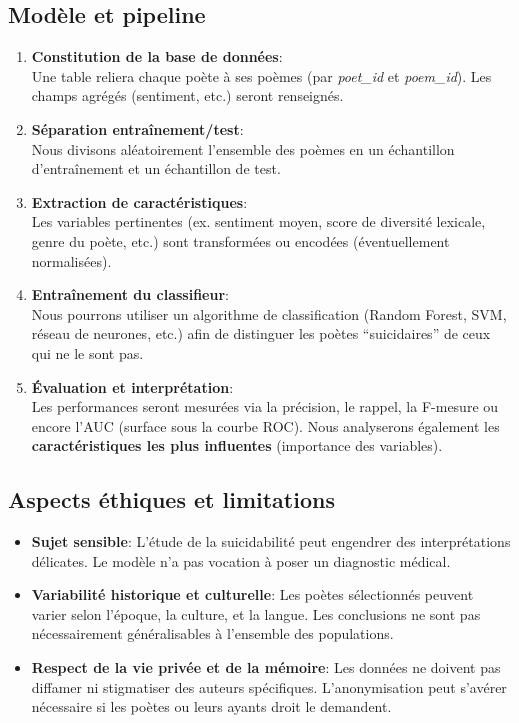 \documentclass[12pt,a4paper]{article}
\begin{document}
\subsection{Modèle et pipeline}

\begin{enumerate}
    \item \textbf{Constitution de la base de données}:\\
    Une table reliera chaque poète à ses poèmes (par \textit{poet\_id} 
    et \textit{poem\_id}). 
    Les champs agrégés (sentiment, etc.) seront renseignés.

    \item \textbf{Séparation entraînement/test}:\\
    Nous divisons aléatoirement l'ensemble des poèmes 
    en un échantillon d'entraînement et un échantillon de test.

    \item \textbf{Extraction de caractéristiques}:\\
    Les variables pertinentes (ex. sentiment moyen, score de diversité lexicale, 
    genre du poète, etc.) sont transformées ou encodées (éventuellement normalisées).

    \item \textbf{Entraînement du classifieur}:\\
    Nous pourrons utiliser un algorithme de classification (Random Forest, 
    SVM, réseau de neurones, etc.) afin de distinguer les poètes ``suicidaires'' 
    de ceux qui ne le sont pas.

    \item \textbf{Évaluation et interprétation}:\\
    Les performances seront mesurées via la précision, le rappel, la F-mesure 
    ou encore l'AUC (surface sous la courbe ROC). Nous analyserons également 
    les \textbf{caractéristiques les plus influentes} (importance des variables).
\end{enumerate}

\subsection{Aspects éthiques et limitations}

\begin{itemize}
    \item \textbf{Sujet sensible}: 
    L'étude de la suicidabilité peut engendrer des interprétations délicates. 
    Le modèle n'a pas vocation à poser un diagnostic médical.

    \item \textbf{Variabilité historique et culturelle}: 
    Les poètes sélectionnés peuvent varier selon l'époque, la culture, 
    et la langue. Les conclusions ne sont pas nécessairement généralisables 
    à l'ensemble des populations.

    \item \textbf{Respect de la vie privée et de la mémoire}: 
    Les données ne doivent pas diffamer ni stigmatiser des auteurs spécifiques. 
    L'anonymisation peut s'avérer nécessaire si les poètes ou leurs ayants droit 
    le demandent.
\end{itemize}
\end{document}
